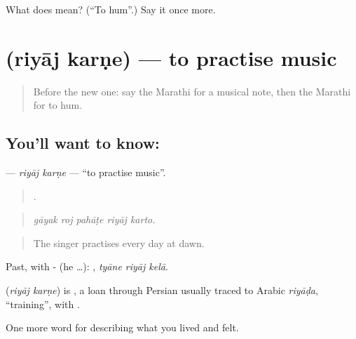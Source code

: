 \begin{tcolorbox}[breakable,colback=teal!4,colframe=teal!35!black,title={Before you move on}]
What does  mean? (\textquotedblleft{}To hum\textquotedblright{}.) Say it once more.
\end{tcolorbox}
\section[\texorpdfstring{\mr{रियाज} \mr{करणे} (riyāj karṇe)}{रियाज करणे (riyāj karṇe)}]{  (riyāj karṇe) — to practise music}

\label{lesson:MR-C536-riyaj-karne}



\begin{quote}
Before the new one: say the Marathi for a musical note, then the Marathi for to hum.
\end{quote}

\subsection*{You'll want to know:  }
\textbf{ } — \emph{riyāj karṇe} — \textquotedblleft{}to practise music\textquotedblright{}.

\begin{quote}
    .
\end{quote}

\begin{quote}
\emph{gāyak roj pahāṭe riyāj karto.}
\end{quote}

\begin{quote}
The singer practises every day at dawn.
\end{quote}

Past, with - (he …):   , \emph{tyāne riyāj kelā}.

\begin{cousinweb}
\textbf{ } (\emph{riyāj karṇe}) is , a loan through Persian usually traced to Arabic \emph{riyāḍa}, \textquotedblleft{}training\textquotedblright{}, with .
\end{cousinweb}

\begin{grammarlens}[title={What you've built}]
One more word for describing what you lived and felt.
\end{grammarlens}

